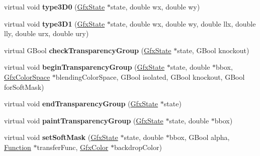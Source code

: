 \begin{DoxyCompactItemize}
\item 
\mbox{\label{class_splash_output_dev_a53049bb1f66a17ce738f3e5423ea4baa}} 
virtual void {\bfseries type3\+D0} (\hyperlink{class_gfx_state}{Gfx\+State} $\ast$state, double wx, double wy)
\item 
\mbox{\label{class_splash_output_dev_a2ef7c3495d18cf3c46ab7dddcfd11a19}} 
virtual void {\bfseries type3\+D1} (\hyperlink{class_gfx_state}{Gfx\+State} $\ast$state, double wx, double wy, double llx, double lly, double urx, double ury)
\item 
\mbox{\label{class_splash_output_dev_ad9a8bcbe9f88b964d6b777d0ee9717a9}} 
virtual G\+Bool {\bfseries check\+Transparency\+Group} (\hyperlink{class_gfx_state}{Gfx\+State} $\ast$state, G\+Bool knockout)
\item 
\mbox{\label{class_splash_output_dev_a2246929a4e882888927dd269fc3a5a9b}} 
virtual void {\bfseries begin\+Transparency\+Group} (\hyperlink{class_gfx_state}{Gfx\+State} $\ast$state, double $\ast$bbox, \hyperlink{class_gfx_color_space}{Gfx\+Color\+Space} $\ast$blending\+Color\+Space, G\+Bool isolated, G\+Bool knockout, G\+Bool for\+Soft\+Mask)
\item 
\mbox{\label{class_splash_output_dev_a9a75bcd28cda50c09c689143b399f805}} 
virtual void {\bfseries end\+Transparency\+Group} (\hyperlink{class_gfx_state}{Gfx\+State} $\ast$state)
\item 
\mbox{\label{class_splash_output_dev_a2c48ab27384046399b81275c8c232476}} 
virtual void {\bfseries paint\+Transparency\+Group} (\hyperlink{class_gfx_state}{Gfx\+State} $\ast$state, double $\ast$bbox)
\item 
\mbox{\label{class_splash_output_dev_a855b36136a435dcc5780d20e8ccae816}} 
virtual void {\bfseries set\+Soft\+Mask} (\hyperlink{class_gfx_state}{Gfx\+State} $\ast$state, double $\ast$bbox, G\+Bool alpha, \hyperlink{class_function}{Function} $\ast$transfer\+Func, \hyperlink{struct_gfx_color}{Gfx\+Color} $\ast$backdrop\+Color)
\item 
\mbox{\label{class_splash_output_dev_aaacd9b0440674444e4ba0afbea4edc98}} 

\end{DoxyCompactItemize}
